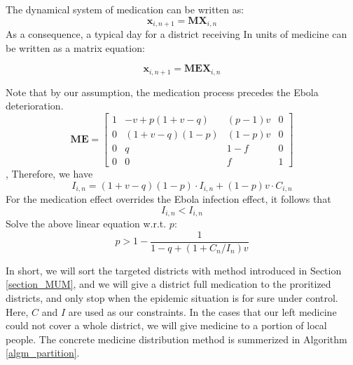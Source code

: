 \documentclass[12pt,a4paper,titlepage]{article}
\begin{document}
The dynamical system of medication can be written as:
\begin{equation}
	\label{eqn_dynamicInfect_matrix}
	\textbf{x}_{i,n+1} = \textbf{MX}_{i,n}
\end{equation}
As a consequence, a typical day for a district receiving In units of medicine can be written as a matrix equation:

\begin{equation}
	\label{eqn_dynamicInfect_matrix}
	\textbf{x}_{i,n+1} = \textbf{MEX}_{i,n}
\end{equation}

Note that by our assumption, the medication process precedes the Ebola deterioration.
\begin{equation}
    \textbf{ME} = 
         \begin{bmatrix}
             1 & -v+p(1+v-q) & (p-1)v & 0\\
             0 & (1+v-q)(1-p) & (1-p)v & 0\\
             0 & q & 1-f & 0\\
             0 & 0 & f & 1
         \end{bmatrix}
\end{equation},
Therefore, we have
\begin{equation}
    I_{i,n} = (1+v-q)(1-p)\cdot I_{i,n}+(1-p)v\cdot C_{i,n}
\end{equation}
For the medication effect overrides the Ebola infection effect, it follows that
\begin{equation}
    I_{i,n} < I_{i,n}
\end{equation}
Solve the above linear equation w.r.t. $p$: 
 \begin{equation}
    p > 1 - \frac{1}{1-q+(1+C_n/I_n)v}
\end{equation}

In short, we will sort the targeted districts with method introduced in Section \ref{section_MUM}, and we will give a district full medication to the proritized districts, and only stop when the epidemic situation is for sure under control. Here, $C$ and $I$ are used as our constraints. In the cases that our left medicine could not cover a whole district, we will give medicine to a portion of local people. The concrete medicine distribution method is summerized in Algorithm \ref{algm_partition}. 
\end{document}
